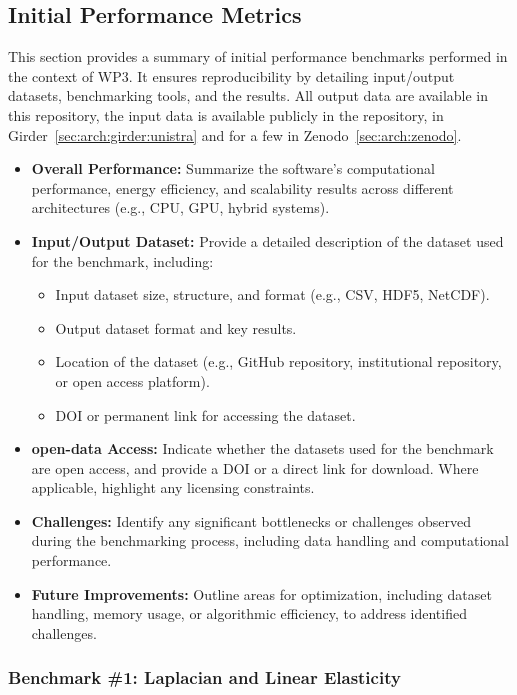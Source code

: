 \subsection{Initial Performance Metrics}
\label{sec:WP3:Feelpp:metrics}

This section provides a summary of initial performance benchmarks performed in the context of WP3. It ensures reproducibility by detailing input/output datasets, benchmarking tools, and the results. 
All output data are available in this repository, the input data is available publicly in the \Feelpp repository, in Girder~\cref{sec:arch:girder:unistra} and for a few in Zenodo~\cref{sec:arch:zenodo}.

\iffalse
\begin{itemize}
    \item \textbf{Overall Performance:} Summarize the software's computational performance, energy efficiency, and scalability results across different architectures (e.g., CPU, GPU, hybrid systems).
    \item \textbf{Input/Output Dataset:} Provide a detailed description of the dataset used for the benchmark, including:
        \begin{itemize}
            \item Input dataset size, structure, and format (e.g., CSV, HDF5, NetCDF).
            \item Output dataset format and key results.
            \item Location of the dataset (e.g., GitHub repository, institutional repository, or open access platform).
            \item DOI or permanent link for accessing the dataset.
        \end{itemize}
    \item \textbf{open-data Access:} Indicate whether the datasets used for the benchmark are open access, and provide a DOI or a direct link for download. Where applicable, highlight any licensing constraints.
    \item \textbf{Challenges:} Identify any significant bottlenecks or challenges observed during the benchmarking process, including data handling and computational performance.
    \item \textbf{Future Improvements:} Outline areas for optimization, including dataset handling, memory usage, or algorithmic efficiency, to address identified challenges.
\end{itemize}

\subsubsection{Benchmark \#1: Laplacian and Linear Elasticity}
